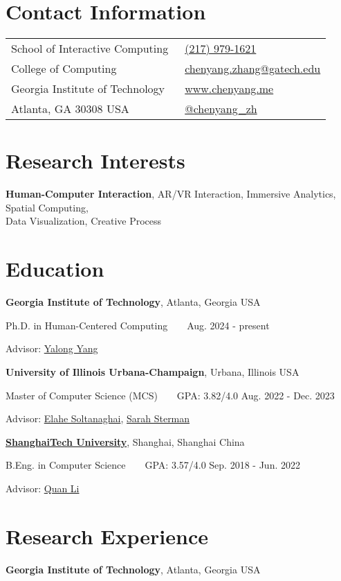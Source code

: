\documentclass[margin,line]{res}
\makeatletter
\newenvironment{list1}{
  \begin{list}{\ding{113}}{%
      \setlength{\itemsep}{0in}
      \setlength{\parsep}{0in} \setlength{\parskip}{0in}
      \setlength{\topsep}{0in} \setlength{\partopsep}{0in} 
      \setlength{\leftmargin}{0.17in}}}{\end{list}}
\newcommand{\ContactInfo}[8]{
\begin{tabular}{@{}p{3.0in}p{3in}}

#1 & \hspace{.01cm}\raisebox{-0.2ex}{} ~\textcolor{themecolor}{#5} \vspace{.06cm} \\

#2 & \raisebox{-0.2ex}{} ~\textcolor{themecolor}{#6} \vspace{.06cm} \\

#3 & \hspace{.06cm}\raisebox{-0.2ex}{}\hspace{.08cm} ~\textcolor{themecolor}{#7} \vspace{.06cm} \\

#4 & \hspace{-.01cm}\raisebox{-0.2ex}{} ~\textcolor{themecolor}{#8}
\end{tabular}
}
\newcommand{\SectionTitle}[1]{
\vspace{-.1cm}
\section{#1}
\vspace{.2cm}
}
\newcommand{\EducationItem}[6]{
  \vspace{-.2cm}
  {\bf #1}, #2 \\
  \vspace{-.3cm}
  \begin{list1}
  \item[] #3 ~ ~ #6 \hfill #4
  \vspace*{.025in}
  \item[] #5
  \end{list1}
}
\newcommand{\institute}[3]{{\bf #1}, #2, #3}
\makeatother
\begin{document}

\begin{resume}
\section{Contact Information}
\vspace{.05in}
\ContactInfo
{School of Interactive Computing}{College of Computing}{Georgia Institute of Technology}{Atlanta, GA 30308 USA}
{\href{sms:+12179791621}{(217) 979-1621}}
{\href{mailto:chenyang.zhang@gatech.edu}{chenyang.zhang@gatech.edu}}
{\href{http://www.chenyang.me}{www.chenyang.me}}
{\href{https://twitter.com/chenyang_zh}{@chenyang\_zh}}


\vspace{-.3cm}
\section{Research Interests}
\textbf{Human-Computer Interaction}, AR/VR Interaction, Immersive Analytics, Spatial Computing,\\ Data Visualization, Creative Process


\SectionTitle{Education}

\EducationItem{Georgia Institute of Technology}{Atlanta, Georgia USA}
{Ph.D. in Human-Centered Computing}{Aug. 2024 - present}
{Advisor: \href{https://ivi.cc.gatech.edu/people.html}{Yalong Yang}}
{}

\EducationItem{University of Illinois Urbana-Champaign}{Urbana, Illinois USA}
{Master of Computer Science (MCS)}{Aug. 2022 - Dec. 2023}
{Advisor: \href{https://elahe.web.illinois.edu/}{Elahe Soltanaghai}, \href{https://www.ssterman.web.illinois.edu/}{Sarah Sterman}}
{GPA: 3.82/4.0}

\EducationItem{\href{https://www.shanghaitech.edu.cn/eng}{ShanghaiTech University}}{Shanghai, Shanghai China}
{B.Eng. in Computer Science}{Sep. 2018 - Jun. 2022}
{Advisor: \href{https://faculty.sist.shanghaitech.edu.cn/liquan/}{Quan Li}}
{GPA: 3.57/4.0}


\SectionTitle{Research Experience}

\vspace{-.2cm}

\vspace{-.1cm}
\institute{Georgia Institute of Technology}{Atlanta}{Georgia USA}
\vspace{-.1cm}


\end{resume}
\end{document}
